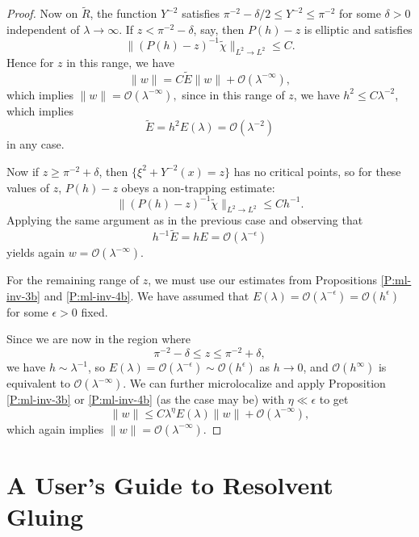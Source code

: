 \documentclass[twoside, final]{amsart}
\theoremstyle{definition}
\numberwithin{equation}{section}
\begin{document}
\begin{proof}
Now on ${\tilde{R}}$, the function $Y^{-2}$ satisfies $\pi^{-2} - \delta/2
{\leqslant} Y^{-2} {\leqslant} \pi^{-2}$ for some $\delta>0$ independent of $\lambda
\to \infty$.  If $z < \pi^{-2} - \delta$, say, then $P(h) - z$ is
elliptic and satisfies
\[
\| (P(h)-z)^{-1} {\tilde{\chi}} \|_{L^2 \to L^2} {\leqslant} C.
\]
Hence for $z$ in this range, we have
\[
\| w \| =  C {\widetilde{E}} \| w \| + {{\mathcal O}}( \lambda^{-\infty} ) ,
\]
which implies $\| w \| = {{\mathcal O}}( \lambda^{-\infty} ),$ since in this range
of $z$, we have $h^2 {\leqslant} C \lambda^{-2}$, which implies
\[
{\widetilde{E}} = h^2 E(\lambda) = {{\mathcal O}}( \lambda^{-2} )
\]
in any case.  

Now if $z {\geqslant} \pi^{-2} + \delta$, then $\{ \xi^2 + Y^{-2}(x) = z \}$
has no critical points, so for these values of $z$, $P(h) -z$ obeys a
non-trapping estimate:
\[
\| (P(h) -z)^{-1} {\tilde{\chi}} \|_{L^2 \to L^2} {\leqslant} C h^{-1}.
\]
Applying the same argument as in the previous case and observing that 
\[
h^{-1} {\widetilde{E}} = h E = {{\mathcal O}}( \lambda^{-\epsilon} )
\]
yields again $w = {{\mathcal O}}( \lambda^{-\infty} )$.

For the remaining range of $z$, we must use our estimates from Propositions
\ref{P:ml-inv-3b} and \ref{P:ml-inv-4b}.  
We have assumed that $E(\lambda) = {{\mathcal O}} (
\lambda^{-\epsilon} ) = {{\mathcal O}}( h^\epsilon)$ for some $\epsilon >0$
fixed.

Since we are now in the region where 
\[
\pi^{-2} - \delta {\leqslant} z {\leqslant} \pi^{-2} + \delta,
\]
we have $h \sim \lambda^{-1}$, so $E(\lambda) = {{\mathcal O}} (
\lambda^{-\epsilon}) \sim {{\mathcal O}}( h^\epsilon)$ as $h \to 0$,
 and ${{\mathcal O}}(h^\infty)$ is equivalent to ${{\mathcal O}}( \lambda^{-\infty})$.  We
can further microlocalize and apply Proposition \ref{P:ml-inv-3b} or
\ref{P:ml-inv-4b} (as the case may be) with $\eta \ll \epsilon$ to get 
\[
\| w \| {\leqslant} C \lambda^{\eta} E(\lambda) \| w \| + {{\mathcal O}}( \lambda^{-\infty} ) ,
\]
which again implies $\| w \| = {{\mathcal O}}(\lambda^{-\infty} )$.

\end{proof}

\appendix

\section{A User's Guide to Resolvent Gluing}
\end{document}
